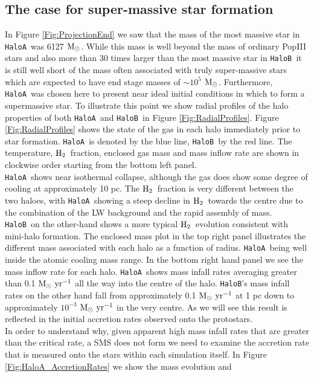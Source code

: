 \documentclass[twocolumn,iop,revtex4]{openjournal}
\newcommand{\msolarc} {$\rm{M_{\odot}}$}
\newcommand{\msolaryr} {$\rm{M_{\odot}~yr^{-1}}~$}
\newcommand{\molH} {$\rm{H_2}$~}
\newcommand{\ha} {\texttt{HaloA~}}
\newcommand{\hb} {\texttt{HaloB~}}
\newcommand{\hbc} {\texttt{HaloB}}
\begin{document}
\subsection{The case for super-massive star formation}
In Figure \ref{Fig:ProjectionEnd} we saw that the mass of the most massive star in \ha was
6127 \msolarc. While this mass is well beyond the mass of ordinary PopIII stars
\citep{Turk_2009, Greif_2011, Wise_2012b, Crosby_2013, Susa_2014, Hirano_2014, Stacy_2016} and also more than 30 times
larger than the most massive star in \hb it is still well short of the mass often associated with
truly super-massive stars \citep[e.g.][]{Woods_2018} which are expected to have
end stage masses of $\sim 10^5$ \msolarc. Furthermore, \ha was chosen here to present near ideal
initial conditions in which to form a supermassive star.
To illustrate this point we show radial profiles of the halo properties of both \ha and \hb in
Figure \ref{Fig:RadialProfiles}. Figure \ref{Fig:RadialProfiles} shows the state of the gas
in each halo immediately prior to star formation. \ha is denoted by the blue line, \hb by the red line.
The temperature, \molH fraction, enclosed gas mass and mass inflow rate are shown in
clockwise order starting from the bottom left panel. \\
\indent \ha shows near isothermal collapse, although the gas does
show some degree of cooling at approximately 10 pc. The \molH fraction is very different between
the two haloes, with \ha showing a steep decline in \molH towards the centre due to the combination
of the LW background and the rapid assembly of mass. \hb on the other-hand shows a more typical
\molH evolution consistent with mini-halo formation. The enclosed mass plot in the top right panel
illustrates the different mass associated with each halo as a function of radius. \ha being well
inside the atomic cooling mass range. In the bottom right hand panel we see the mass inflow rate for
each halo. \ha shows mass infall rates averaging greater than 0.1 \msolaryr all the way into the
centre of the halo. \hbc's mass infall rates on the other hand fall from approximately
0.1 \msolaryr at 1 pc down to approximately $10^{-3}$ \msolaryr in the very centre. As we will see
this result is reflected in the initial accretion rates observed onto the protostars. \\
\indent In order to understand why, given apparent high mass infall rates that are greater than the
critical rate, a SMS does not form we need to examine the accretion rate that is measured onto the
stars within each simulation itself. In Figure \ref{Fig:HaloA_AccretionRates} we show the mass evolution and
\end{document}
